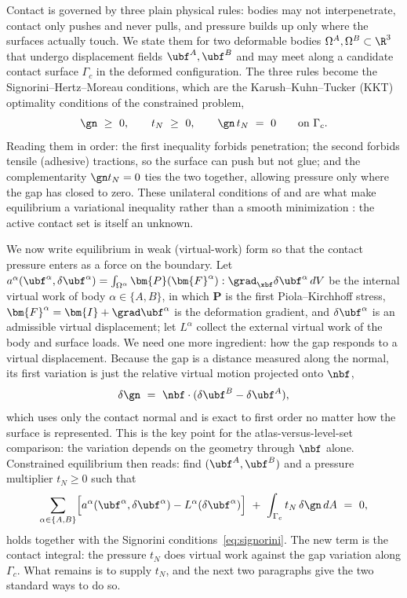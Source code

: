 Contact is governed by three plain physical rules: bodies may not interpenetrate, contact only
pushes and never pulls, and pressure builds up only where the surfaces actually touch. We state them
for two deformable bodies $\Omega^A,\Omega^B\subset\R^3$ that undergo displacement fields
$\ubf^A,\ubf^B$ and may meet along a candidate contact surface $\Gamma_c$ in the deformed
configuration. The three rules become the Signorini--Hertz--Moreau conditions, which are the
Karush--Kuhn--Tucker (KKT) optimality conditions of the constrained problem,
\begin{equation}\label{eq:signorini}
\gn\ \ge\ 0,\qquad t_N\ \ge\ 0,\qquad \gn\, t_N\ =\ 0\qquad\text{on }\Gamma_c .
\end{equation}
Reading them in order: the first inequality forbids penetration; the second forbids tensile
(adhesive) tractions, so the surface can push but not glue; and the complementarity $\gn t_N=0$ ties
the two together, allowing pressure only where the gap has closed to zero. These unilateral
conditions of \citet{johnson1985contact} and \citet{wriggers2006computational} are what make
equilibrium a variational inequality rather than a smooth minimization
\citep{kikuchi1988contact,laursen2002computational}: the active contact set is itself an unknown.

We now write equilibrium in weak (virtual-work) form so that the contact pressure enters as a force
on the boundary. Let
$a^\alpha(\ubf^\alpha,\delta\ubf^\alpha)=\int_{\Omega^\alpha}\bm{P}(\bm{F}^\alpha):\grad_{\xbf}\delta\ubf^\alpha\,dV$
be the internal virtual work of body $\alpha\in\{A,B\}$, in which $\bm{P}$ is the first
Piola--Kirchhoff stress, $\bm{F}^\alpha=\bm{I}+\grad\ubf^\alpha$ is the deformation gradient, and
$\delta\ubf^\alpha$ is an admissible virtual displacement; let $L^\alpha$ collect the external
virtual work of the body and surface loads. We need one more ingredient: how the gap responds to a
virtual displacement. Because the gap is a distance measured along the normal, its first variation is
just the relative virtual motion projected onto $\nbf$,
\begin{equation}\label{eq:gap-variation}
\delta\gn\ =\ \nbf\cdot(\delta\ubf^B-\delta\ubf^A),
\end{equation}
which uses only the contact normal and is exact to first order no matter how the surface is
represented. This is the key point for the atlas-versus-level-set comparison: the variation depends on
the geometry through $\nbf$ alone. Constrained equilibrium then reads: find $(\ubf^A,\ubf^B)$ and a
pressure multiplier $t_N\ge0$ such that
\begin{equation}\label{eq:weak-contact}
\sum_{\alpha\in\{A,B\}}\!\Big[a^\alpha(\ubf^\alpha,\delta\ubf^\alpha)-L^\alpha(\delta\ubf^\alpha)\Big]
\ +\ \int_{\Gamma_c} t_N\,\delta\gn\,dA\ =\ 0,
\end{equation}
holds together with the Signorini conditions~\eqref{eq:signorini}. The new term is the contact
integral: the pressure $t_N$ does virtual work against the gap variation along $\Gamma_c$. What
remains is to supply $t_N$, and the next two paragraphs give the two standard ways to do so.

